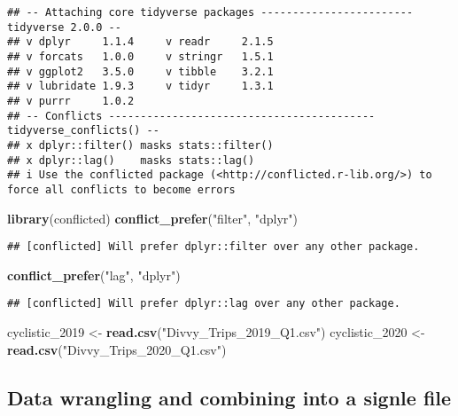 \documentclass[
]{article}
\newenvironment{Shaded}{\begin{snugshade}}{\end{snugshade}}
\newcommand{\FunctionTok}[1]{\textcolor[rgb]{0.13,0.29,0.53}{\textbf{#1}}}
\newcommand{\NormalTok}[1]{#1}
\newcommand{\OtherTok}[1]{\textcolor[rgb]{0.56,0.35,0.01}{#1}}
\newcommand{\StringTok}[1]{\textcolor[rgb]{0.31,0.60,0.02}{#1}}
\begin{document}
\begin{verbatim}
## -- Attaching core tidyverse packages ------------------------ tidyverse 2.0.0 --
## v dplyr     1.1.4     v readr     2.1.5
## v forcats   1.0.0     v stringr   1.5.1
## v ggplot2   3.5.0     v tibble    3.2.1
## v lubridate 1.9.3     v tidyr     1.3.1
## v purrr     1.0.2     
## -- Conflicts ------------------------------------------ tidyverse_conflicts() --
## x dplyr::filter() masks stats::filter()
## x dplyr::lag()    masks stats::lag()
## i Use the conflicted package (<http://conflicted.r-lib.org/>) to force all conflicts to become errors
\end{verbatim}

\begin{Shaded}
\begin{Highlighting}[]
\FunctionTok{library}\NormalTok{(conflicted)}
\FunctionTok{conflict\_prefer}\NormalTok{(}\StringTok{"filter"}\NormalTok{, }\StringTok{"dplyr"}\NormalTok{)}
\end{Highlighting}
\end{Shaded}

\begin{verbatim}
## [conflicted] Will prefer dplyr::filter over any other package.
\end{verbatim}

\begin{Shaded}
\begin{Highlighting}[]
\FunctionTok{conflict\_prefer}\NormalTok{(}\StringTok{"lag"}\NormalTok{, }\StringTok{"dplyr"}\NormalTok{)}
\end{Highlighting}
\end{Shaded}

\begin{verbatim}
## [conflicted] Will prefer dplyr::lag over any other package.
\end{verbatim}

\begin{Shaded}
\begin{Highlighting}[]
\NormalTok{cyclistic\_2019 }\OtherTok{\textless{}{-}} \FunctionTok{read.csv}\NormalTok{(}\StringTok{"Divvy\_Trips\_2019\_Q1.csv"}\NormalTok{)}
\NormalTok{cyclistic\_2020 }\OtherTok{\textless{}{-}} \FunctionTok{read.csv}\NormalTok{(}\StringTok{"Divvy\_Trips\_2020\_Q1.csv"}\NormalTok{)}
\end{Highlighting}
\end{Shaded}

\hypertarget{data-wrangling-and-combining-into-a-signle-file}{%
\subsection{Data wrangling and combining into a signle
file}\label{data-wrangling-and-combining-into-a-signle-file}}
\end{document}

